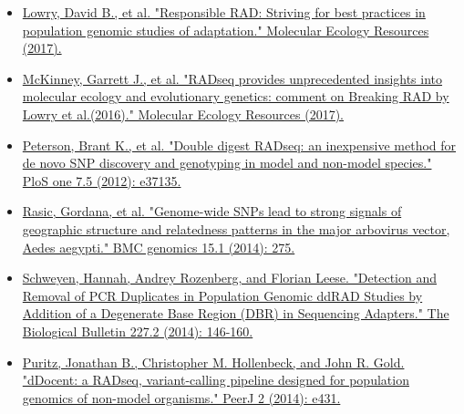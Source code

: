 \documentclass[11pt]{article}
\begin{document}
\begin{itemize}
\item \href{http://onlinelibrary.wiley.com/doi/10.1111/1755-0998.12677/abstract}{Lowry, David B., et al. "Responsible RAD: Striving for best practices in population genomic studies of adaptation." Molecular Ecology Resources (2017).}
\end{itemize}


\begin{itemize}
\item \href{http://onlinelibrary.wiley.com/doi/10.1111/1755-0998.12649/abstract}{McKinney, Garrett J., et al. "RADseq provides unprecedented insights into molecular ecology and evolutionary genetics: comment on Breaking RAD by Lowry et al.(2016)." Molecular Ecology Resources (2017).}
\end{itemize}


\begin{itemize}
\item \href{http://journals.plos.org/plosone/article?id=10.1371/journal.pone.0037135#pone-0037135-g005}{Peterson, Brant K., et al. "Double digest RADseq: an inexpensive method for de novo SNP discovery and genotyping in model and non-model species." PloS one 7.5 (2012): e37135.}
\end{itemize}


\begin{itemize}
\item \href{http://www.biomedcentral.com/1471-2164/15/275}{Rasic, Gordana, et al. "Genome-wide SNPs lead to strong signals of geographic structure and relatedness patterns in the major arbovirus vector, Aedes aegypti." BMC genomics 15.1 (2014): 275.}
\end{itemize}


\begin{itemize}
\item \href{http://www.biolbull.org/content/227/2/146.short}{Schweyen, Hannah, Andrey Rozenberg, and Florian Leese. "Detection and Removal of PCR Duplicates in Population Genomic ddRAD Studies by Addition of a Degenerate Base Region (DBR) in Sequencing Adapters." The Biological Bulletin 227.2 (2014): 146-160.}
\end{itemize}


\begin{itemize}
\item \href{https://peerj.com/articles/431/}{Puritz, Jonathan B., Christopher M. Hollenbeck, and John R. Gold. "dDocent: a RADseq, variant-calling pipeline designed for population genomics of non-model organisms." PeerJ 2 (2014): e431.}
\end{itemize}
\end{document}
